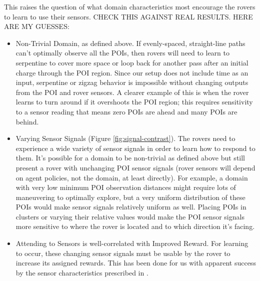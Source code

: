 \documentclass[letterpaper, 10 pt, conference]{ieeeconf}  %
\begin{document}
This raises the question of what domain characteristics most encourage the rovers to learn to use their sensors. CHECK THIS AGAINST REAL RESULTS. HERE ARE MY GUESSES:
\begin{itemize}
\item Non-Trivial Domain, as defined above. If evenly-spaced, straight-line paths can't optimally observe all the POIs, then rovers will need to learn to serpentine to cover more space or loop back for another pass after an initial charge through the POI region. Since our setup does not include time as an input, serpentine or zigzag behavior is impossible without changing outputs from the POI and rover sensors. A clearer example of this is when the rover learns to turn around if it overshoots the POI region; this requires sensitivity to a sensor reading that means zero POIs are ahead and many POIs are behind. 
\item Varying Sensor Signals (Figure \ref{fig:signal-contrast}). The rovers need to experience a wide variety of sensor signals in order to learn how to respond to them. It's possible for a domain to be non-trivial as defined above but still present a rover with unchanging POI sensor signals (rover sensors will depend on agent policies, not the domain, at least directly). For example, a domain with very low minimum POI observation distances might require lots of maneuvering to optimally explore, but a very uniform distribution of these POIs would make sensor signals relatively uniform as well. Placing POIs in clusters or varying their relative values would make the POI sensor signals more sensitive to where the rover is located and to which direction it's facing. 
\item Attending to Sensors is well-correlated with Improved Reward. For learning to occur, these changing sensor signals must be usable by the rover to increase its assigned rewards. This has been done for us with apparent success by the sensor characteristics prescribed in \cite{agogino2008analyzing}.


\end{itemize}
\end{document}
